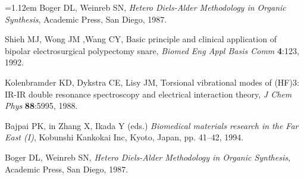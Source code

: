 \documentclass{ws-bme}
\begin{document}
\begin{multicols}{2}
\noindent\hangindent=1.12em Boger DL, Weinreb SN, {\it Hetero
Diels-Alder Methodology in Organic Synthesis}, Academic Press, San
Diego, 1987.

\begin{thebibliography}{9}
 Shieh MJ, Wong JM ,Wang CY, Basic principle and clinical
application of bipolar electrosurgical polypectomy snare, {\it
Biomed Eng Appl Basis Comm} {\bf 4}:123, 1992.

 Kolenbramder KD, Dykstra CE, Lisy JM, Torsional vibrational modes
of (HF)3: IR-IR double resonance spectroscopy and electrical
interaction theory, {\it J Chem Phys} {\bf 88}:5995, 1988.

 Bajpai PK, in Zhang X, Ikada Y (eds.) {\it Biomedical materials
research in the Far East (I)}, Kobunshi Kankokai Inc, Kyoto, Japan,
pp. 41--42, 1994.

 Boger DL, Weinreb SN, {\it Hetero Diels-Alder Methodology in
Organic Synthesis}, Academic Press, San Diego, 1987.
\end{thebibliography}
\end{multicols}
\end{document}
